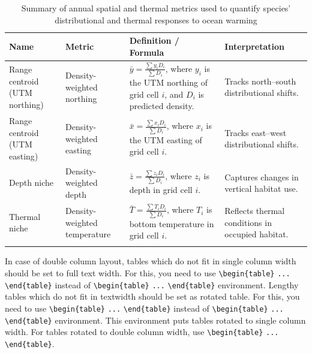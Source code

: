 \documentclass[lineno,pdflatex,sn-nature]{sn-jnl}%
\begin{document}
\begin{table}
\caption{Summary of annual spatial and thermal metrics used to quantify species’ distributional and thermal responses to ocean warming}
\label{table:derived_quantities}
\centering
\renewcommand{\arraystretch}{1.5}
\begin{tabular}{@{}p{3.2cm}p{3.5cm}p{5cm}p{4.3cm}@{}}
\toprule
Name & Metric & Definition / Formula & Interpretation \\
\midrule
Range centroid (UTM northing) & Density-weighted northing &
$\bar{y} = \frac{\sum y_i D_i}{\sum D_i}$, where $y_i$ is the UTM northing of grid cell $i$, and $D_i$ is predicted density. &
Tracks north–south distributional shifts. \\
Range centroid (UTM easting) & Density-weighted easting &
$\bar{x} = \frac{\sum x_i D_i}{\sum D_i}$, where $x_i$ is the UTM easting of grid cell $i$. &
Tracks east–west distributional shifts. \\
Depth niche & Density-weighted depth &
$\bar{z} = \frac{\sum z_i D_i}{\sum D_i}$, where $z_i$ is depth in grid cell $i$. &
Captures changes in vertical habitat use. \\
Thermal niche & Density-weighted temperature &
$\bar{T} = \frac{\sum T_i D_i}{\sum D_i}$, where $T_i$ is bottom temperature in grid cell $i$. &
Reflects thermal conditions in occupied habitat. \\
\botrule
\end{tabular}
\end{table}

In case of double column layout, tables which do not fit in single column width should be set to full text width. For this, you need to use \verb+\begin{table}+ \verb+...+ \verb+\end{table}+ instead of \verb+\begin{table}+ \verb+...+ \verb+\end{table}+ environment. Lengthy tables which do not fit in textwidth should be set as rotated table. For this, you need to use \verb+\begin{table}+ \verb+...+ \verb+\end{table}+ instead of \verb+\begin{table}+ \verb+...+ \verb+\end{table}+ environment. This environment puts tables rotated to single column width. For tables rotated to double column width, use \verb+\begin{table}+ \verb+...+ \verb+\end{table}+.
\end{document}
